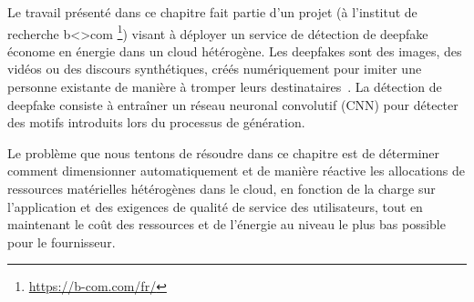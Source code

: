 Le travail présenté dans ce chapitre fait partie d'un projet (à l'institut de recherche b{\textless\textgreater}com \footnote{\href{https://b-com.com/fr/}{https://b-com.com/fr/}}) visant à déployer un service de détection de deepfake économe en énergie dans un cloud hétérogène. Les deepfakes sont des images, des vidéos ou des discours synthétiques, créés numériquement pour imiter une personne existante de manière à tromper leurs destinataires~\cite{westerlundEmergenceDeepfakeTechnology2019}. La détection de deepfake consiste à entraîner un réseau neuronal convolutif (CNN) pour détecter des motifs introduits lors du processus de génération.


Le problème que nous tentons de résoudre dans ce chapitre est de déterminer comment dimensionner automatiquement et de manière réactive les allocations de ressources matérielles hétérogènes dans le cloud, en fonction de la charge sur l'application et des exigences de qualité de service des utilisateurs, tout en maintenant le coût des ressources et de l'énergie au niveau le plus bas possible pour le fournisseur.

